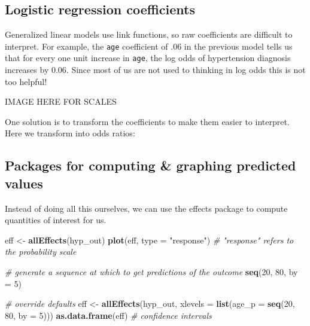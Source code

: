 \documentclass[]{book}
\newenvironment{Shaded}{\begin{snugshade}}{\end{snugshade}}
\newcommand{\CommentTok}[1]{\textcolor[rgb]{0.56,0.35,0.01}{\textit{#1}}}
\newcommand{\DataTypeTok}[1]{\textcolor[rgb]{0.13,0.29,0.53}{#1}}
\newcommand{\DecValTok}[1]{\textcolor[rgb]{0.00,0.00,0.81}{#1}}
\newcommand{\KeywordTok}[1]{\textcolor[rgb]{0.13,0.29,0.53}{\textbf{#1}}}
\newcommand{\NormalTok}[1]{#1}
\newcommand{\OperatorTok}[1]{\textcolor[rgb]{0.81,0.36,0.00}{\textbf{#1}}}
\newcommand{\StringTok}[1]{\textcolor[rgb]{0.31,0.60,0.02}{#1}}
\begin{document}
\hypertarget{logistic-regression-coefficients}{%
\subsection{Logistic regression coefficients}\label{logistic-regression-coefficients}}

Generalized linear models use link functions, so raw coefficients are difficult to interpret. For example, the \texttt{age} coefficient of .06 in the previous model tells us that for every one unit increase in \texttt{age}, the log odds of hypertension diagnosis increases by 0.06. Since most of us are not used to thinking in log odds this is not too helpful!

IMAGE HERE FOR SCALES

One solution is to transform the coefficients to make them easier to interpret. Here we transform into odds ratios:

\begin{Shaded}
\end{Shaded}

\hypertarget{packages-for-computing-graphing-predicted-values}{%
\subsection{Packages for computing \& graphing predicted values}\label{packages-for-computing-graphing-predicted-values}}

Instead of doing all this ourselves, we can use the effects package to compute quantities of interest for us.

\begin{Shaded}
\begin{Highlighting}[]
\NormalTok{  eff <-}\StringTok{ }\KeywordTok{allEffects}\NormalTok{(hyp_out)}
  \KeywordTok{plot}\NormalTok{(eff, }\DataTypeTok{type =} \StringTok{"response"}\NormalTok{) }\CommentTok{# "response" refers to the probability scale}

  \CommentTok{# generate a sequence at which to get predictions of the outcome}
  \KeywordTok{seq}\NormalTok{(}\DecValTok{20}\NormalTok{, }\DecValTok{80}\NormalTok{, }\DataTypeTok{by =} \DecValTok{5}\NormalTok{)}

  \CommentTok{# override defaults}
\NormalTok{  eff <-}\StringTok{ }\KeywordTok{allEffects}\NormalTok{(hyp_out, }\DataTypeTok{xlevels =} \KeywordTok{list}\NormalTok{(}\DataTypeTok{age_p =} \KeywordTok{seq}\NormalTok{(}\DecValTok{20}\NormalTok{, }\DecValTok{80}\NormalTok{, }\DataTypeTok{by =} \DecValTok{5}\NormalTok{)))}
  \KeywordTok{as.data.frame}\NormalTok{(eff) }\CommentTok{# confidence intervals}
\end{Highlighting}
\end{Shaded}
\end{document}
